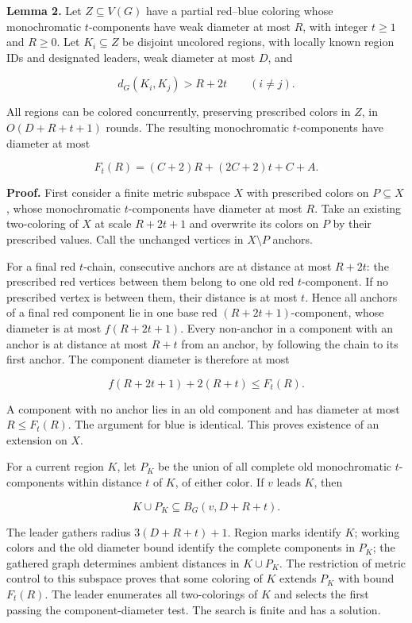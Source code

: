 \documentclass[11pt,a4paper]{article}
\begin{document}
\textbf{Lemma 2.} Let \(Z\subseteq V(G)\) have a partial red--blue coloring whose monochromatic \(t\)-components have weak diameter at most \(R\), with integer \(t\ge1\) and \(R\ge0\).
Let \(K_i\subseteq Z\) be disjoint uncolored regions, with locally known region IDs and designated leaders, weak diameter at most \(D\), and

\[ d_G(K_i,K_j)>R+2t\qquad(i\ne j). \]

All regions can be colored concurrently, preserving prescribed colors in \(Z\), in \(O(D+R+t+1)\) rounds.
The resulting monochromatic \(t\)-components have diameter at most

\[ F_t(R)=(C+2)R+(2C+2)t+C+A. \]

\textbf{Proof.} First consider a finite metric subspace \(X\) with prescribed colors on \(P\subseteq X\), whose monochromatic \(t\)-components have diameter at most \(R\).
Take an existing two-coloring of \(X\) at scale \(R+2t+1\) and overwrite its colors on \(P\) by their prescribed values.
Call the unchanged vertices in \(X\setminus P\) anchors.

For a final red \(t\)-chain, consecutive anchors are at distance at most \(R+2t\): the prescribed red vertices between them belong to one old red \(t\)-component.
If no prescribed vertex is between them, their distance is at most \(t\).
Hence all anchors of a final red component lie in one base red \((R+2t+1)\)-component, whose diameter is at most \(f(R+2t+1)\).
Every non-anchor in a component with an anchor is at distance at most \(R+t\) from an anchor, by following the chain to its first anchor.
The component diameter is therefore at most

\[ f(R+2t+1)+2(R+t)\le F_t(R). \]

A component with no anchor lies in an old component and has diameter at most \(R\le F_t(R)\).
The argument for blue is identical.
This proves existence of an extension on \(X\).

For a current region \(K\), let \(P_K\) be the union of all complete old monochromatic \(t\)-components within distance \(t\) of \(K\), of either color.
If \(v\) leads \(K\), then

\[ K\cup P_K\subseteq B_G(v,D+R+t). \]

The leader gathers radius \(3(D+R+t)+1\).
Region marks identify \(K\); working colors and the old diameter bound identify the complete components in \(P_K\); the gathered graph determines ambient distances in \(K\cup P_K\).
The restriction of metric control to this subspace proves that some coloring of \(K\) extends \(P_K\) with bound \(F_t(R)\).
The leader enumerates all two-colorings of \(K\) and selects the first passing the component-diameter test.
The search is finite and has a solution.
\end{document}
